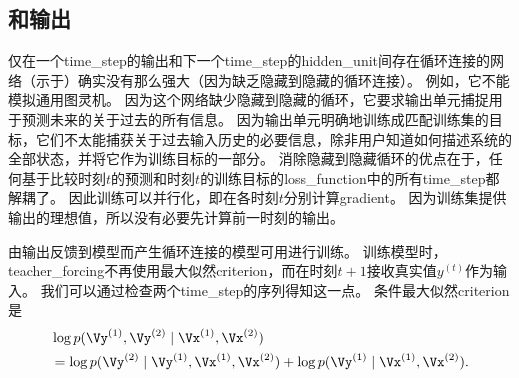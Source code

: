 
\subsection{和输出}
\label{sec:teacher_forcing_and_networks_with_output_recurrence}
仅在一个\gls{time_step}的输出和下一个\gls{time_step}的\gls{hidden_unit}间存在循环连接的网络（示于）确实没有那么强大（因为缺乏隐藏到隐藏的循环连接）。
例如，它不能模拟通用图灵机。
因为这个网络缺少隐藏到隐藏的循环，它要求输出单元捕捉用于预测未来的关于过去的所有信息。
因为输出单元明确地训练成匹配训练集的目标，它们不太能捕获关于过去输入历史的必要信息，除非用户知道如何描述系统的全部状态，并将它作为训练目标的一部分。
消除隐藏到隐藏循环的优点在于，任何基于比较时刻$t$的预测和时刻$t$的训练目标的\gls{loss_function}中的所有\gls{time_step}都解耦了。
因此训练可以并行化，即在各时刻$t$分别计算\gls{gradient}。
因为训练集提供输出的理想值，所以没有必要先计算前一时刻的输出。

由输出反馈到模型而产生循环连接的模型可用进行训练。
训练模型时，\gls{teacher_forcing}不再使用最大似然\gls{criterion}，而在时刻$t+1$接收真实值$y^{(t)}$作为输入。
我们可以通过检查两个\gls{time_step}的序列得知这一点。
条件最大似然\gls{criterion}是
\begin{align}
 &\log p(\Vy^{(1)},\Vy^{(2)} \mid \Vx^{(1)}, \Vx^{(2)} ) \\
 &= \log  p(\Vy^{(2)} \mid \Vy^{(1)}, \Vx^{(1)}, \Vx^{(2)} )  + \log p(\Vy^{(1)} \mid \Vx^{(1)}, \Vx^{(2)}) .
\end{align}



